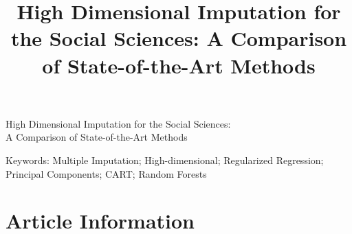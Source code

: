 \documentclass[]{./cls/interact}
\theoremstyle{plain}
\theoremstyle{definition}
\theoremstyle{remark}
\begin{document}

\title{High Dimensional Imputation for the Social Sciences: A Comparison of State-of-the-Art Methods}

\author{
}

\maketitle
\pagebreak

{\titlefont %
	High Dimensional Imputation for the Social Sciences: \\
	A Comparison of State-of-the-Art Methods
}
\linebreak 

\begin{abstract}
	
\end{abstract}

\begin{keywords}
	Keywords:
	Multiple Imputation; 
	High-dimensional; 
	Regularized Regression; 
	Principal Components; 
	CART; 
	Random Forests
\end{keywords}






















\section{Article Information}
\end{document}
